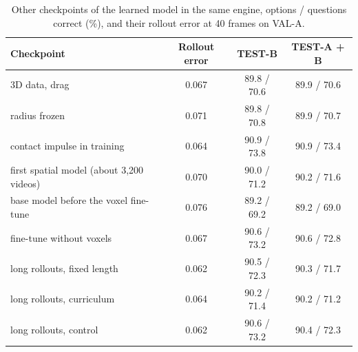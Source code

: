 \begin{table}[h]
\caption{Other checkpoints of the learned model in the same engine, options / questions correct (\%), and their rollout error at 40 frames on VAL-A.}
\label{tab:ckpt}
\centering
\small
\begin{tabular}{@{}lccc@{}}
\toprule
Checkpoint & Rollout error & TEST-B & TEST-A + B \\
\midrule
3D data, drag & 0.067 & 89.8 / 70.6 & 89.9 / 70.6 \\
radius frozen & 0.071 & 89.8 / 70.8 & 89.9 / 70.7 \\
contact impulse in training & 0.064 & 90.9 / 73.8 & 90.9 / 73.4 \\
first spatial model (about 3,200 videos) & 0.070 & 90.0 / 71.2 & 90.2 / 71.6 \\
base model before the voxel fine-tune & 0.076 & 89.2 / 69.2 & 89.2 / 69.0 \\
fine-tune without voxels & 0.067 & 90.6 / 73.2 & 90.6 / 72.8 \\
long rollouts, fixed length & 0.062 & 90.5 / 72.3 & 90.3 / 71.7 \\
long rollouts, curriculum & 0.064 & 90.2 / 71.4 & 90.2 / 71.2 \\
long rollouts, control & 0.062 & 90.6 / 73.2 & 90.4 / 72.3 \\
\bottomrule
\end{tabular}
\end{table}
